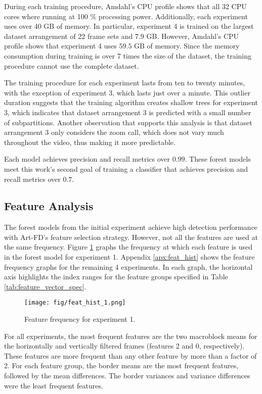During each training procedure, Amdahl's CPU profile shows that all 32 CPU cores where running at 100 \% processing power. Additionally, each experiment uses over 40 GB of memory. In particular, experiment 4 is trained on the largest dataset arrangement of 22 frame sets and 7.9 GB. However, Amdahl's CPU profile shows that experiment 4 uses $59.5$ GB of memory. Since the memory consumption during training is over 7 times the size of the dataset, the training procedure cannot use the complete dataset.

The training procedure for each experiment lasts from ten to twenty minutes, with the exception of experiment 3, which lasts just over a minute. This outlier duration suggests that the training algorithm creates shallow trees for experiment 3, which indicates that dataset arrangement 3 is predicted with a small number of subpartitions. Another observation that supports this analysis is that dataset arrangement 3 only considers the zoom call, which does not vary much throughout the video, thus making it more predictable.

Each model achieves precision and recall metrics over $0.99$. These forest models meet this work's second goal of training a classifier that achieves precision and recall metrics over $0.7$.

\subsection{Feature Analysis}
\label{sec:res_feat_analysis}

The forest models from the initial experiment achieve high detection performance with Art-FD's feature selection strategy. However, not all the features are used at the same frequency. Figure \ref{fig:feathist.1} graphs the frequency at which each feature is used in the forest model for experiment 1. Appendix \ref{apx:feat_hist} shows the feature frequency graphs for the remaining 4 experiments. In each graph, the horizontal axis highlights the index ranges for the feature groups specified in Table \ref{tab:feature_vector_spec}.

\begin{figure} [!h]
  \centering
  \texttt{[image: fig/feat\_hist\_1.png]}
  \caption{Feature frequency for experiment 1.}
  \label{fig:feathist.1}
\end{figure}

For all experiments, the most frequent features are the two macroblock means for the horizontally and vertically filtered frames (features 2 and 0, respectively). These features are more frequent than any other feature by more than a factor of 2. For each feature group, the border means are the most frequent features, followed by the mean differences. The border variances and variance differences were the least frequent features.

